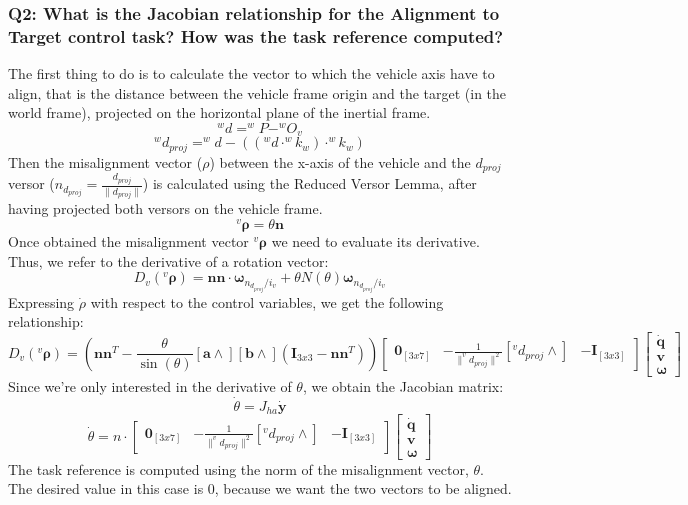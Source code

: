 \documentclass{article}
\begin{document}
\subsubsection{Q2: What is the Jacobian relationship for the Alignment to Target control task? How was the task reference computed?}
The first thing to do is to calculate the vector to which the vehicle axis have to align, that is the distance between the vehicle frame origin  and the target (in the world frame), projected on the horizontal plane of the inertial frame. 
$$ ^wd = ^wP - ^wO_v$$
$$^wd_{proj} = ^wd - ((^wd \cdot ^wk_w) \cdot ^wk_w)$$
Then the misalignment vector (\(\rho\)) between the x-axis of the vehicle and the \(d_{proj}\) versor (\(n_{d_{proj}}=\frac{d_{proj}}{\|d_{proj}\|}\)) is calculated using the Reduced Versor Lemma, after having projected both versors on the vehicle frame.
$$^v\bm{\rho} = \theta \bm{n}$$
Once obtained the misalignment vector $^v\bm{\rho} $ we need to evaluate its derivative. Thus, we refer to the derivative of a rotation vector:
$$
D_v (^v\bm{\rho}) = \bm{n}\bm{n} \cdot \bm{\omega}_{n_{d_{proj}}/i_v} + \theta N(\theta)\bm{\omega}_{n_{d_{proj}}/i_v}
$$
Expressing $ \dot{\rho} $ with respect to the control variables, we get the following relationship:
$$ D_v (^v\bm{\rho}) = \left( \bm{n}\bm{n}^T - \frac{\theta}{\sin(\theta )}\left[\bm{a} \wedge \right] \left[\bm{b} \wedge \right] \left( \bm{I }_{3x3} - \bm{n}\bm{n}^T \right) \right) \begin{bmatrix} \bm{0}_{[3x7]} & -\frac{1}{\|^vd_{proj}\|^2}[^vd_{proj}\wedge] & -\bm{I}_{[3x3]} \end{bmatrix} \begin{bmatrix} \bm{\dot{q}}   \\ \bm{v} \\ \bm{\omega} \end{bmatrix} $$
Since we're only interested in the derivative of $ \theta $, we obtain the Jacobian matrix:
$$ \dot{\theta} = J_{ha} \bm{\dot{y}}$$
$$ \dot{\theta} = n \cdot \begin{bmatrix} \bm{0}_{[3x7]} & -\frac{1}{\|^vd_{proj}\|^2}[^vd_{proj}\wedge] & -\bm{I}_{[3x3]} \end{bmatrix} \begin{bmatrix} \bm{\dot{q}}   \\ \bm{v} \\ \bm{\omega} \end{bmatrix} $$
The task reference is computed using the norm of the misalignment vector, $\theta$. The desired value in this case is \(0\), because we want the two vectors to be aligned.
\end{document}
